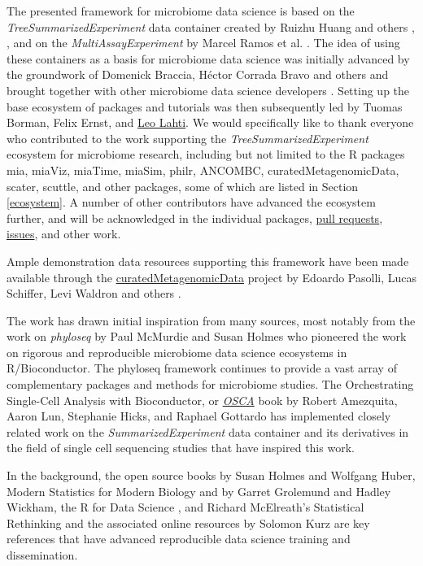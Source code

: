 \documentclass[
]{book}
\begin{document}
The presented framework for microbiome data science is based on the
\emph{TreeSummarizedExperiment} data container created by Ruizhu Huang and
others \citep{R_TreeSummarizedExperiment}, \citep{Ernst2020}, and on the
\emph{MultiAssayExperiment} by Marcel Ramos et al. \citep{Ramos2017}. The idea
of using these containers as a basis for microbiome data science was
initially advanced by the groundwork of Domenick Braccia, Héctor
Corrada Bravo and others and brought together with other microbiome
data science developers \citep{Shetty2019}. Setting up the base ecosystem
of packages and tutorials was then subsequently led by Tuomas Borman,
Felix Ernst, and \href{http://www.iki.fi/Leo.Lahti}{Leo Lahti}. We would
specifically like to thank everyone who contributed to the work
supporting the \emph{TreeSummarizedExperiment} ecosystem for microbiome
research, including but not limited to the R packages mia, miaViz,
miaTime, miaSim, philr, ANCOMBC, curatedMetagenomicData, scater,
scuttle, and other packages, some of which are listed in Section
\ref{ecosystem}. A number of other contributors have advanced the
ecosystem further, and will be acknowledged in the individual
packages, \href{https://github.com/microbiome/OMA/graphs/contributors}{pull
requests},
\href{https://github.com/microbiome/OMA/issues}{issues}, and other work.

Ample demonstration data resources supporting this framework have been
made available through the
\href{https://waldronlab.io/curatedMetagenomicData/}{curatedMetagenomicData}
project by Edoardo Pasolli, Lucas Schiffer, Levi Waldron and others
\citep{Pasolli2017}.

The work has drawn initial inspiration from many sources, most notably
from the work on \emph{phyloseq} by Paul McMurdie and Susan Holmes
\citep{McMurdie2013} who pioneered the work on rigorous and reproducible
microbiome data science ecosystems in R/Bioconductor. The phyloseq
framework continues to provide a vast array of complementary packages
and methods for microbiome studies. The Orchestrating Single-Cell
Analysis with Bioconductor, or
\href{https://bioconductor.org/books/release/OSCA/}{\emph{OSCA}} book by Robert
Amezquita, Aaron Lun, Stephanie Hicks, and Raphael Gottardo
\citep{Amezquita2020natmeth} has implemented closely related work on the
\emph{SummarizedExperiment} data container and its derivatives in the field
of single cell sequencing studies that have inspired this work.

In the background, the open source books by Susan Holmes and Wolfgang
Huber, Modern Statistics for Modern Biology \citep{Holmes2019} and by
Garret Grolemund and Hadley Wickham, the R for Data Science
\citep{Grolemund2017}, and Richard McElreath's Statistical Rethinking and
the associated online resources by Solomon Kurz \citep{McElreath2020} are
key references that have advanced reproducible data science training
and dissemination.
\end{document}
